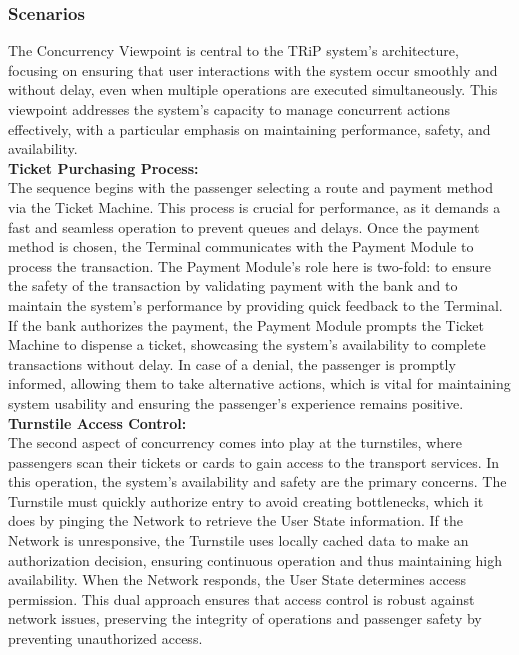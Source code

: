 \subsubsection{Scenarios}


The Concurrency Viewpoint is central to the TRiP system's architecture, focusing on ensuring that user interactions with the system occur smoothly and without delay, even when multiple operations are executed simultaneously. This viewpoint addresses the system's capacity to manage concurrent actions effectively, with a particular emphasis on maintaining performance, safety, and availability. \\

\noindent\textbf{Ticket Purchasing Process:} \\
The sequence begins with the passenger selecting a route and payment method via the Ticket Machine. This process is crucial for performance, as it demands a fast and seamless operation to prevent queues and delays. Once the payment method is chosen, the Terminal communicates with the Payment Module to process the transaction. The Payment Module's role here is two-fold: to ensure the safety of the transaction by validating payment with the bank and to maintain the system's performance by providing quick feedback to the Terminal. If the bank authorizes the payment, the Payment Module prompts the Ticket Machine to dispense a ticket, showcasing the system's availability to complete transactions without delay. In case of a denial, the passenger is promptly informed, allowing them to take alternative actions, which is vital for maintaining system usability and ensuring the passenger's experience remains positive. \\

\noindent \textbf{Turnstile Access Control:} \\
The second aspect of concurrency comes into play at the turnstiles, where passengers scan their tickets or cards to gain access to the transport services. In this operation, the system's availability and safety are the primary concerns. The Turnstile must quickly authorize entry to avoid creating bottlenecks, which it does by pinging the Network to retrieve the User State information. If the Network is unresponsive, the Turnstile uses locally cached data to make an authorization decision, ensuring continuous operation and thus maintaining high availability. When the Network responds, the User State determines access permission. This dual approach ensures that access control is robust against network issues, preserving the integrity of operations and passenger safety by preventing unauthorized access. \\

